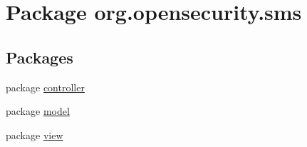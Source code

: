 \hypertarget{a00033}{\section{Package org.\+opensecurity.\+sms}
\label{a00033}
}
\subsection*{Packages}
\begin{DoxyCompactItemize}
\item 
package \hyperlink{a00034}{controller}
\item 
package \hyperlink{a00035}{model}
\item 
package \hyperlink{a00040}{view}
\end{DoxyCompactItemize}
